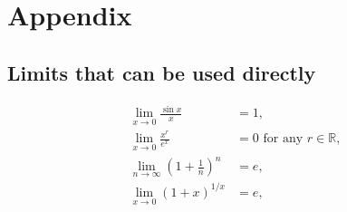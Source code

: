 \documentclass[a4paper,10pt]{article}
\newcommand{\R}{\mathbb{R}}
\begin{document}
\newpage
\appendix
\section{Appendix}
\subsection{Limits that can be used directly}
\begin{align*}
    \lim\limits_{x\to 0}\frac{\sin x}{x} &= 1,\\
    \lim\limits_{x\to 0}\frac{x^r}{e^x} &= 0 \text{ for any } r\in\R,\\
    \lim\limits_{n\to\infty} \left(1 + \frac{1}{n}\right)^n &= e,\\
    \lim\limits_{x\to 0} (1 + x)^{1/x} &= e,\\
\end{align*}
\end{document}
